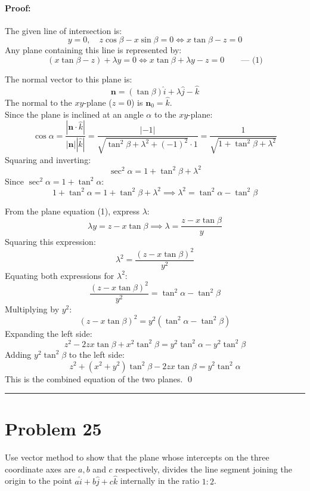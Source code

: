 \documentclass[11pt,a4paper]{article}
\begin{document}
\paragraph{Proof:}
The given line of intersection is:
$$y = 0, \quad z\cos\beta - x\sin\beta = 0 \iff x\tan\beta - z = 0$$
Any plane containing this line is represented by:
$$(x\tan\beta - z) + \lambda y = 0 \iff x\tan\beta + \lambda y - z = 0 \qquad \text{--- (1)}$$

The normal vector to this plane is:
$$\mathbf{n} = (\tan\beta)\hat{i} + \lambda\hat{j} - \hat{k}$$
The normal to the $xy$-plane ($z = 0$) is $\mathbf{n}_0 = \hat{k}$.\\
Since the plane is inclined at an angle $\alpha$ to the $xy$-plane:
$$\cos\alpha = \frac{|\mathbf{n} \cdot \hat{k}|}{|\mathbf{n}||\hat{k}|} = \frac{|-1|}{\sqrt{\tan^2\beta + \lambda^2 + (-1)^2} \cdot 1} = \frac{1}{\sqrt{1 + \tan^2\beta + \lambda^2}}$$
Squaring and inverting:
$$\sec^2\alpha = 1 + \tan^2\beta + \lambda^2$$
Since $\sec^2\alpha = 1 + \tan^2\alpha$:
$$1 + \tan^2\alpha = 1 + \tan^2\beta + \lambda^2 \implies \lambda^2 = \tan^2\alpha - \tan^2\beta$$

From the plane equation (1), express $\lambda$:
$$\lambda y = z - x\tan\beta \implies \lambda = \frac{z - x\tan\beta}{y}$$
Squaring this expression:
$$\lambda^2 = \frac{(z - x\tan\beta)^2}{y^2}$$
Equating both expressions for $\lambda^2$:
$$\frac{(z - x\tan\beta)^2}{y^2} = \tan^2\alpha - \tan^2\beta$$
Multiplying by $y^2$:
$$(z - x\tan\beta)^2 = y^2(\tan^2\alpha - \tan^2\beta)$$
Expanding the left side:
$$z^2 - 2zx\tan\beta + x^2\tan^2\beta = y^2\tan^2\alpha - y^2\tan^2\beta$$
Adding $y^2\tan^2\beta$ to the left side:
$$z^2 + (x^2 + y^2)\tan^2\beta - 2zx\tan\beta = y^2\tan^2\alpha$$
This is the combined equation of the two planes. \qed

\vspace{0.4cm}
\hrule
\vspace{0.4cm}

\section{Problem 25}
\begin{problembox}[Problem 25]
Use vector method to show that the plane whose intercepts on the three coordinate axes are $a, b$ and $c$ respectively, divides the line segment joining the origin to the point $a\hat{i} + b\hat{j} + c\hat{k}$ internally in the ratio $1 : 2$.
\end{problembox}
\end{document}
